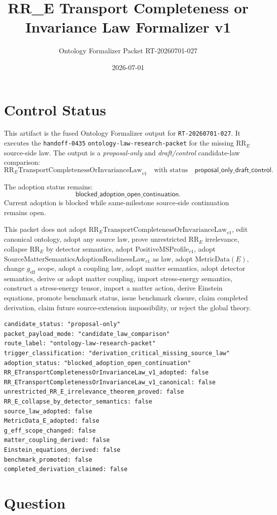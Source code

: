 \documentclass[11pt]{article}
\title{RR\_E Transport Completeness or Invariance Law Formalizer v1}
\author{Ontology Formalizer Packet RT-20260701-027}
\date{2026-07-01}
\newcommand{\RRE}{\mathrm{RR}_{E}}
\newcommand{\LawRR}{\mathrm{RR}_{E}\mathrm{TransportCompletenessOrInvarianceLaw}_{v1}}
\newcommand{\MetricData}{\mathrm{MetricData}}
\newcommand{\geff}{g_{\mathrm{eff}}}
\newcommand{\BlockedOpen}{\mathsf{blocked\_adoption\_open\_continuation}}
\newcommand{\CandidateStatus}{\mathsf{proposal\_only\_draft\_control}}
\begin{document}
\maketitle

\section{Control Status}

This artifact is the fused Ontology Formalizer output for
\texttt{RT-20260701-027}. It executes the \texttt{handoff-0435}
\texttt{ontology-law-research-packet} for the missing \(\RRE\) source-side
law. The output is a \emph{proposal-only} and \emph{draft/control}
candidate-law comparison:
\[
  \LawRR \quad\text{with status}\quad \CandidateStatus .
\]

The adoption status remains:
\[
  \BlockedOpen .
\]
Current adoption is blocked while same-milestone source-side continuation
remains open.

This packet does not adopt \(\LawRR\), edit canonical ontology, adopt any
source law, prove unrestricted \(\RRE\) irrelevance, collapse \(\RRE\) by
detector semantics, adopt PositiveMSProfile\(_{v1}\), adopt
SourceMatterSemanticsAdoptionReadinessLaw\(_{v1}\) as law, adopt
\(\MetricData(E)\), change \(\geff\) scope, adopt a coupling law, adopt matter
semantics, adopt detector semantics, derive or adopt matter coupling, import
stress-energy semantics, construct a stress-energy tensor, import a matter
action, derive Einstein equations, promote benchmark status, issue benchmark
closure, claim completed derivation, claim future source-extension
impossibility, or reject the global theory.

\begin{verbatim}
candidate_status: "proposal-only"
packet_payload_mode: "candidate_law_comparison"
route_label: "ontology-law-research-packet"
trigger_classification: "derivation_critical_missing_source_law"
adoption_status: "blocked_adoption_open_continuation"
RR_ETransportCompletenessOrInvarianceLaw_v1_adopted: false
RR_ETransportCompletenessOrInvarianceLaw_v1_canonical: false
unrestricted_RR_E_irrelevance_theorem_proved: false
RR_E_collapse_by_detector_semantics: false
source_law_adopted: false
MetricData_E_adopted: false
g_eff_scope_changed: false
matter_coupling_derived: false
Einstein_equations_derived: false
benchmark_promoted: false
completed_derivation_claimed: false
\end{verbatim}

\section{Question}
\end{document}
